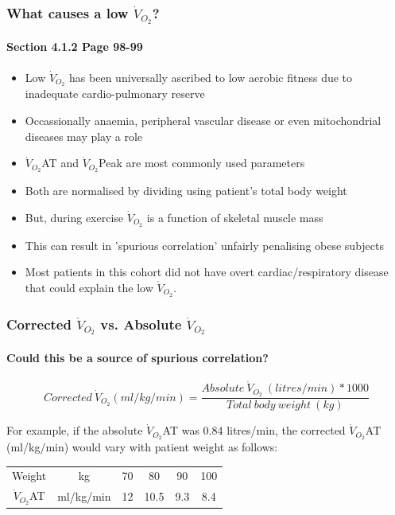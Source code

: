 \documentclass[10pt]{beamer}
\begin{document}
\begin{frame}
	\frametitle{What causes a low $\dot{V}_{O_2}$? }
	\framesubtitle{Section 4.1.2 Page 98-99 }
	\begin{itemize}
		\item Low $\dot{V}_{O_2}$ has been universally ascribed to low aerobic fitness due to inadequate cardio-pulmonary reserve
		\item Occassionally anaemia, peripheral vascular disease or even mitochondrial diseases may play a role
		\item $\dot{V}_{O_2}$AT and $\dot{V}_{O_2}$Peak are most commonly used parameters
		\item Both are normalised by dividing using patient's total body weight
		\item But, during exercise $\dot{V}_{O_2}$ is a function of skeletal muscle mass
		\item This can result in 'spurious correlation' unfairly penalising obese subjects
		\item Most patients in this cohort did not have overt cardiac/respiratory disease that could explain the low $\dot{V}_{O_2}$.
	\end{itemize}
\end{frame}

\begin{frame}
	\frametitle{Corrected $\dot{V}_{O_2}$ vs. Absolute $\dot{V}_{O_2}$}
	\framesubtitle{Could this be a source of spurious correlation?}
	
	\[Corrected\ \dot{V}_{O_2} (ml/kg/min) = \frac{Absolute\ \dot{V}_{O_2}\ (litres/min) * 1000}{Total\ body\ weight\ (kg)}\]

	\vfill
	
	For example, if the absolute $\dot{V}_{O_2}$AT was 0.84 litres/min, the corrected $\dot{V}_{O_2}$AT (ml/kg/min) would vary with patient weight as follows:
	
	\begin{table}
	\begin{tabular}{c c c c c c}
		     Weight       & kg        & 70 & 80   & 90  & 100 \\
		$\dot{V}_{O_2}$AT & ml/kg/min & 12 & 10.5 & 9.3 & 8.4
	\end{tabular}
	\end{table}


\end{frame}
\end{document}
